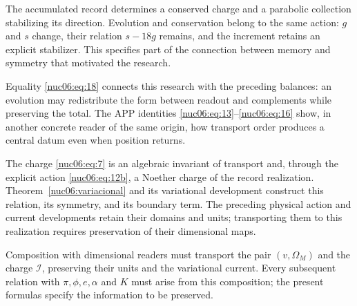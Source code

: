 The accumulated record determines a conserved charge and a parabolic collection stabilizing its direction. Evolution and conservation belong to the same action: \(g\) and \(s\) change, their relation \(s-18g\) remains, and the increment retains an explicit stabilizer. This specifies part of the connection between memory and symmetry that motivated the research.

Equality \eqref{nuc06:eq:18} connects this research with the preceding balances: an evolution may redistribute the form between readout and complements while preserving the total. The APP identities \eqref{nuc06:eq:13}–\eqref{nuc06:eq:16} show, in another concrete reader of the same origin, how transport order produces a central datum even when position returns.

The charge \eqref{nuc06:eq:7} is an algebraic invariant of transport and, through the explicit action \eqref{nuc06:eq:12b}, a Noether charge of the record realization. Theorem~\ref{nuc06:variacional} and its variational development construct this relation, its symmetry, and its boundary term. The preceding physical action and current developments retain their domains and units; transporting them to this realization requires preservation of their dimensional maps.

Composition with dimensional readers must transport the pair \((v,\Omega_M)\) and the charge \(\mathcal I\), preserving their units and the variational current. Every subsequent relation with \(\pi,\phi,e,\alpha\) and \(K\) must arise from this composition; the present formulas specify the information to be preserved.
